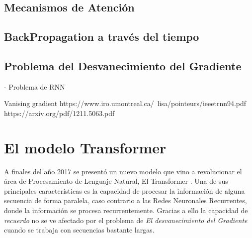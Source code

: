 



\subsection{Mecanismos de Atención}

\subsection{BackPropagation a través del tiempo}

\subsection{Problema del Desvanecimiento del Gradiente}

- Problema de RNN

Vanising gradient
https://www.iro.umontreal.ca/~lisa/pointeurs/ieeetrnn94.pdf
https://arxiv.org/pdf/1211.5063.pdf


\section{El modelo Transformer}

A finales del año 2017 se presentó un nuevo modelo que vino a revolucionar el área de Procesamiento
de Lenguaje Natural, El Transformer \cite{Vaswani}. Una de sus principales características es la
capacidad de procesar la información de alguna secuencia de forma paralela, caso contrario a las
Redes Neuronales Recurrentes, donde la información se procesa recurrentemente. Gracias a ello
la capacidad de \textit{recuerdo} no se ve afectado por el problema de \textit{El
desvanecimiento del Gradiente} cuando se trabaja con secuencias bastante largas.

\begin{figure}
    \begin{center}
        \scalebox{0.4}{}
    \end{center}
\end{figure}
